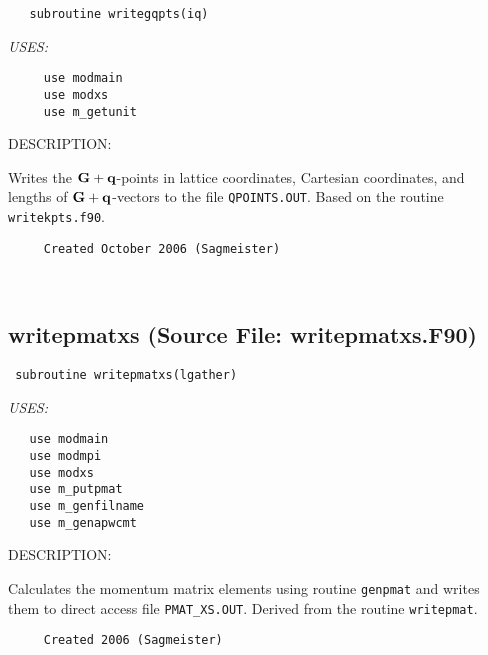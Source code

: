\documentclass[11pt]{article}
\begin{document}
\begin{verbatim}   subroutine writegqpts(iq)\end{verbatim}{\em USES:}
\begin{verbatim}     use modmain
     use modxs
     use m_getunit\end{verbatim}
{\sf DESCRIPTION:\\ }


     Writes the ${\bf G+q}$-points in lattice coordinates, Cartesian 
     coordinates, and lengths of ${\bf G+q}$-vectors to the file 
     {\tt QPOINTS.OUT}. Based on the routine {\tt writekpts.f90}.
  
\begin{verbatim}     Created October 2006 (Sagmeister)\end{verbatim}








 
 
\mbox{}\hrulefill\ 
 
\subsection{writepmatxs (Source File: writepmatxs.F90)}


\begin{verbatim} subroutine writepmatxs(lgather)\end{verbatim}{\em USES:}
\begin{verbatim}   use modmain
   use modmpi
   use modxs
   use m_putpmat
   use m_genfilname
   use m_genapwcmt\end{verbatim}
{\sf DESCRIPTION:\\ }


     Calculates the momentum matrix elements using routine {\tt genpmat} and
     writes them to direct access file {\tt PMAT\_XS.OUT}. Derived from
     the routine {\tt writepmat}.
  
\begin{verbatim}     Created 2006 (Sagmeister)\end{verbatim}
\end{document}

